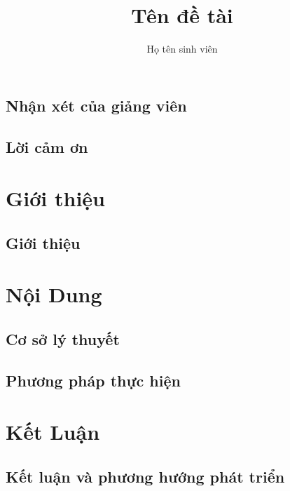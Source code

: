 \documentclass[a4paper,12pt,oneside]{book}
\title{Tên đề tài}						%
\author{Họ tên sinh viên}				%
\begin{document}


\chapter*{Nhận xét của giảng viên}


\chapter*{Lời cảm ơn}


\tableofcontents
\listoffigures
\listoftables

\clearpage


\part{Giới thiệu}
\chapter{Giới thiệu}

\part{Nội Dung}
\chapter{Cơ sở lý thuyết}


\chapter{Phương pháp thực hiện}


\part{Kết Luận}
\chapter{Kết luận và phương hướng phát triển}

{}

\end{document}
